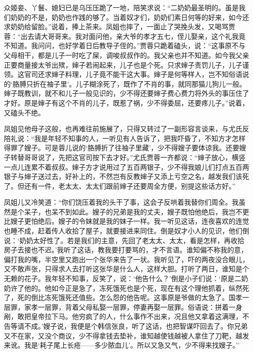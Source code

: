 众姬妾、丫鬟、媳妇已是乌压压跪了一地，陪笑求说：``二奶奶最圣明的。虽是我们奶奶的不是，奶奶也作践的够了。当着奴才们，奶奶们素日何等的好来，如今还求奶奶给留脸。''说着，捧上茶来。凤姐也摔了，一面止了哭挽头发，又喝骂贾蓉：``出去请大哥哥来。我对面问他，亲大爷的孝才五七，侄儿娶亲，这个礼我竟不知道。我问问，也好学着日后教导子侄的。''贾蓉只跪着磕头，说：``这事原不与父母相干，都是儿子一时吃了屎，调唆叔叔作的。我父亲也并不知道。如今我父亲正要商量接太爷出殡，婶子若闹起来，儿子也是个死。只求婶子责罚儿子，儿子谨领。这官司还求婶子料理，儿子竟不能干这大事。婶子是何等样人，岂不知俗语说的`胳膊只折在袖子里'。儿子糊涂死了，既作了不肖的事，就同那猫儿狗儿一般。婶子既教训，就不和儿子一般见识的，少不得还要婶子费心费力将外头的事压住了才好。原是婶子有这个不肖的儿子，既惹了祸，少不得委屈，还要疼儿子。''说着，又磕头不绝。

凤姐见他母子这般，也再难往前施展了，只得又转过了一副形容言谈来，与尤氏反陪礼说：``我是年轻不知事的人，一听见有人告诉了，把我吓昏了，不知方才怎样得罪了嫂子。可是蓉儿说的`胳膊折了往袖子里藏'，少不得嫂子要体谅我。还要嫂子转替哥哥说了，先把这官司按下去才好。''尤氏贾蓉一齐都说：``婶子放心，横竖一点儿连累不着叔叔。婶子方才说用过了五百两银子，少不得我娘儿们打点五百两银子与婶子送过去，好补上的，不然岂有反教婶子又添上亏空之名，越发我们该死了。但还有一件，老太太、太太们跟前婶子还要周全方便，别提这些话方好。''

凤姐儿又冷笑道：``你们饶压着我的头干了事，这会子反哄着我替你们周全。我虽然是个呆子，也呆不到如此。嫂子的兄弟是我的丈夫，嫂子既怕他绝后，我岂不更比嫂子更怕绝后。嫂子的令妹就是我的妹子一样。我一听见这话，连夜喜欢的连觉也睡不成，赶着传人收拾了屋子，就要接进来同住。倒是奴才小人的见识，他们倒说：`奶奶太好性了。若是我们的主意，先回了老太太、太太，看是怎样，再收拾房子去接也不迟。'我听了这话，教我要打要骂的，才不言语。谁知偏不称我的意，偏打我的嘴，半空里又跑出一个张华来告了一状。我听见了，吓的两夜没合眼儿，又不敢声张，只得求人去打听这张华是什么人，这样大胆。打听了两日，谁知是个无赖的花子。我年轻不知事，反笑了，说：`他告什么？'倒是小子们说：`原是二奶奶许了他的。他如今正是急了，冻死饿死也是个死，现在有这个理他抓着，纵然死了，死的倒比冻死饿死还值些。怎么怨的他告呢。这事原是爷做的太急了。国孝一层罪，家孝一层罪，背着父母私娶一层罪，停妻再娶一层罪。俗语说：拼着一身剐，敢把皇帝拉下马。他穷疯了的人，什么事作不出来，况且他又拿着这满理，不告等请不成。'嫂子说，我便是个韩信张良，听了这话，也把智谋吓回去了。你兄弟又不在家，又没个商议，少不得拿钱去垫补，谁知越使钱越被人拿住了刀靶，越发来讹。我是`耗子尾上长疮------多少脓血儿'。所以又急又气，少不得来找嫂子。''

